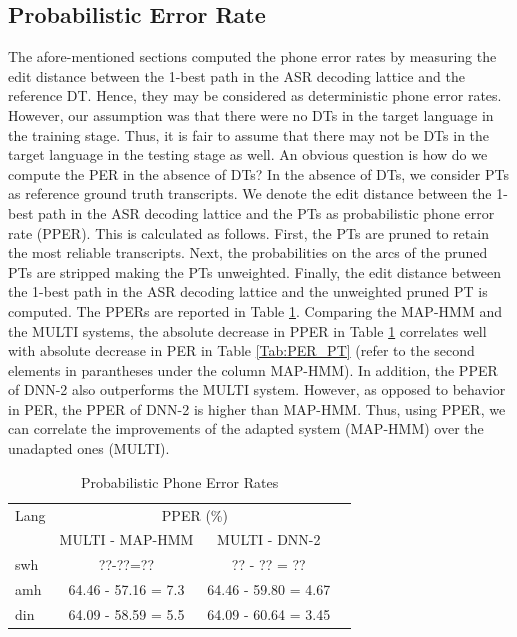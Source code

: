 \documentclass[a4paper]{article}
\begin{document}
\subsection{Probabilistic Error Rate}
\label{sec:Probabilistic Error Rate}
The afore-mentioned sections computed the phone error rates by measuring the edit distance between the 1-best path in the ASR decoding lattice and the reference DT. Hence, they may be considered as deterministic phone error rates. However, our assumption was that there were no DTs in the target language in the training stage. Thus, it is fair to assume that there may not be DTs in the target language in the testing stage as well. An obvious question is how do we compute the PER in the absence of DTs? In the absence of DTs, we consider PTs as reference ground truth transcripts. We denote the edit distance between the 1-best path in the ASR decoding lattice and the PTs as probabilistic phone error rate (PPER).
This is calculated as follows. First, the PTs are pruned to retain the most reliable transcripts. Next, the probabilities on the arcs of the pruned PTs are stripped making the PTs unweighted. Finally, the edit distance between the 1-best path in the ASR decoding lattice and the unweighted pruned PT is computed. The PPERs are reported in Table \ref{Tab:PPER}. Comparing the MAP-HMM and the MULTI systems, the absolute decrease in PPER in Table \ref{Tab:PPER} correlates well with absolute decrease in PER in Table \ref{Tab:PER_PT} (refer to the second elements in parantheses under the column MAP-HMM). In addition, the PPER of DNN-2 also outperforms the MULTI system. However, as opposed to behavior in PER, the PPER of DNN-2 is higher than MAP-HMM. Thus, using PPER, we can correlate the improvements of the adapted system (MAP-HMM) over the unadapted ones (MULTI).

\begin{table}
\centering %
\caption{Probabilistic Phone Error Rates}
\begin{tabular}{l|c c c}
   \hline
Lang  & \multicolumn{2}{c}{PPER (\%)} \\
          &  MULTI - MAP-HMM & MULTI - DNN-2  \\ \hline
swh      &  ??-??=?? & ?? - ?? = ??  \\
amh      & 64.46 - 57.16 = 7.3   & 64.46 - 59.80 = 4.67  \\ 
din     &64.09 - 58.59 = 5.5   &64.09 - 60.64 = 3.45 \\ \hline
\end{tabular}
\vspace{-2mm}
\label{Tab:PPER}
\vspace{-4mm}
\end{table}
\end{document}
